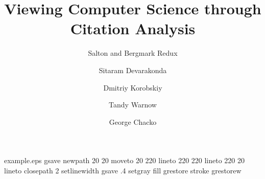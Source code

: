 %
%
%
%
%
\begin{filecontents*}{example.eps}
gsave
newpath
  20 20 moveto
  20 220 lineto
  220 220 lineto
  220 20 lineto
closepath
2 setlinewidth
gsave
  .4 setgray fill
grestore
stroke
grestorew
\end{filecontents*}
%
\RequirePackage{fix-cm}
%
\documentclass[smallextended]{svjour3}       %
%
\smartqed  %
%
\usepackage{graphicx}
\usepackage{xcolor}
\usepackage{listings}
\usepackage{comment}
\usepackage{hyperref}
%
%
%
%
%


\title{Viewing Computer Science through Citation Analysis}


\thanks{Research and development reported in this publication was partially supported by funds from the National Institute on Drug Abuse, National Institutes of Health, US Department of Health and Human Services, under Contract No HHSN271201800040C (N44DA-18-1216). TW is supported by the Grainger Foundation.}
\subtitle{Salton and Bergmark Redux}

\author{Sitaram Devarakonda  \and
	Dmitriy Korobskiy \and
        Tandy Warnow \and
        George Chacko }


